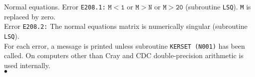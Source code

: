 \Method
Normal equations.
\Errorh
Error {\tt E208.1:}  $\mathtt{M<1}$ or $\mathtt{M>N}$ or
$\mathtt{M>20}$ (subroutine {\tt LSQ}). {\tt M} is replaced by zero.\\
Error {\tt E208.2:}  The normal equations matrix is numerically singular
(subroutine {\tt LSQ}).\\
For each error, a message is printed unless subroutine
{\tt KERSET (N001)} has been called.
\Notes
On computers other than Cray and CDC double-precision arithmetic is used
internally.
\\ $\bullet$
